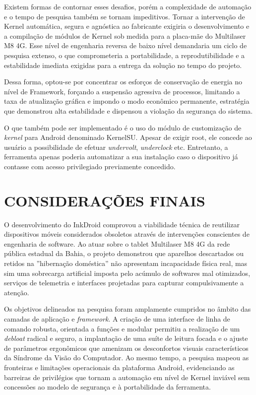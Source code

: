 \documentclass[
    12pt,
    openright,
    oneside,
    a4paper,
    english,
    brazilian
    ]{abntex2}
\begin{document}
Existem formas de contornar esses desafios, porém a complexidade de automação e o tempo de pesquisa também se tornam impeditivos. Tornar a intervenção de Kernel automática, segura e agnóstica ao fabricante exigiria o desenvolvimento e a compilação de módulos de Kernel sob medida para a placa-mãe do Multilaser M8 4G. Esse nível de engenharia reversa de baixo nível demandaria um ciclo de pesquisa extenso, o que comprometeria a portabilidade, a reprodutibilidade e a estabilidade imediata exigidas para a entrega da solução no tempo do projeto.

Dessa forma, optou-se por concentrar os esforços de conservação de energia no nível de Framework, forçando a suspensão agressiva de processos, limitando a taxa de atualização gráfica e impondo o modo econômico permanente, estratégia que demonstrou alta estabilidade e dispensou a violação da segurança do sistema.

O que também pode ser implementado é o uso do módulo de customização de \textit{kernel} para Android denominado KernelSU. Apesar de exigir root, ele concede ao usuário a possibilidade de efetuar \textit{undervolt}, \textit{underclock} etc. Entretanto, a ferramenta apenas poderia automatizar a sua instalação caso o dispositivo já contasse com acesso privilegiado previamente concedido.

\chapter{CONSIDERAÇÕES FINAIS}

O desenvolvimento do InkDroid comprovou a viabilidade técnica de reutilizar dispositivos móveis considerados obsoletos através de intervenções conscientes de engenharia de software. Ao atuar sobre o tablet Multilaser M8 4G da rede pública estadual da Bahia, o projeto demonstrou que aparelhos descartados ou retidos na ''hibernação doméstica'' não apresentam incapacidade física real, mas sim uma sobrecarga artificial imposta pelo acúmulo de softwares mal otimizados, serviços de telemetria e interfaces projetadas para capturar compulsivamente a atenção.

Os objetivos delineados na pesquisa foram amplamente cumpridos no âmbito das camadas de aplicação e \textit{framework}. A criação de uma interface de linha de comando robusta, orientada a funções e modular permitiu a realização de um \textit{debloat} radical e seguro, a implantação de uma suíte de leitura focada e o ajuste de parâmetros ergonômicos que amenizam os desconfortos visuais característicos da Síndrome da Visão do Computador. Ao mesmo tempo, a pesquisa mapeou as fronteiras e limitações operacionais da plataforma Android, evidenciando as barreiras de privilégios que tornam a automação em nível de Kernel inviável sem concessões ao modelo de segurança e à portabilidade da ferramenta.
\end{document}
